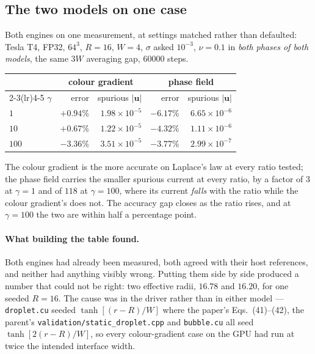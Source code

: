\documentclass[11pt,a4paper]{article}
\newcommand{\code}[1]{\texttt{\small #1}}
\newcommand{\uu}{\bm{u}}
\newcommand{\e}[1]{\times 10^{#1}}
\begin{document}
\subsection{The two models on one case}
\label{sec:cgvspf}

Both engines on one measurement, at settings matched rather than defaulted:
Tesla T4, FP32, $64^3$, $R = 16$, $W = 4$, $\sigma$ asked $10^{-3}$,
$\nu = 0.1$ in \emph{both phases of both models}, the same $3W$ averaging gap,
60000 steps.

\begin{center}
\begin{tabular}{lrrrr}
\toprule
 & \multicolumn{2}{c}{colour gradient} & \multicolumn{2}{c}{phase field} \\
\cmidrule(lr){2-3}\cmidrule(lr){4-5}
$\gamma$ & error & spurious $|\uu|$ & error & spurious $|\uu|$ \\
\midrule
$1$   & $+0.94\%$ & $1.98\e{-5}$ & $-6.17\%$ & $6.65\e{-6}$ \\
$10$  & $+0.67\%$ & $1.22\e{-5}$ & $-4.32\%$ & $1.11\e{-6}$ \\
$100$ & $-3.36\%$ & $3.51\e{-5}$ & $-3.77\%$ & $2.99\e{-7}$ \\
\bottomrule
\end{tabular}
\end{center}

The colour gradient is the more accurate on Laplace's law at every ratio tested;
the phase field carries the smaller spurious current at every ratio, by a factor
of $3$ at $\gamma = 1$ and of $118$ at $\gamma = 100$, where its current
\emph{falls} with the ratio while the colour gradient's does not. The accuracy
gap closes as the ratio rises, and at $\gamma = 100$ the two are within half a
percentage point.

\paragraph{What building the table found.} Both engines had already been
measured, both agreed with their host references, and neither had anything
visibly wrong. Putting them side by side produced a number that could not be
right: two effective radii, $16.78$ and $16.20$, for one seeded $R = 16$. The
cause was in the driver rather than in either model --- \code{droplet.cu} seeded
$\tanh[(r-R)/W]$ where the paper's Eqs.~(41)--(42), the parent's
\code{validation/static\_droplet.cpp} and \code{bubble.cu} all seed
$\tanh[2(r-R)/W]$, so every colour-gradient case on the GPU had run at twice the
intended interface width.
\end{document}
